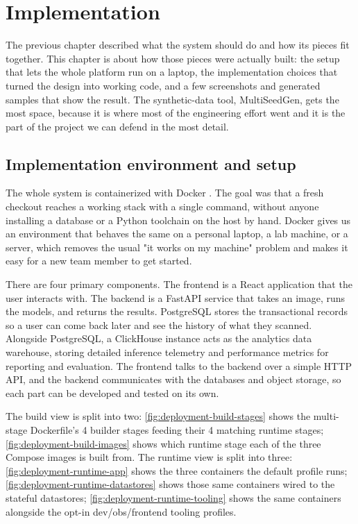 \chapter{Implementation}

The previous chapter described what the system should do and how its pieces fit
together. This chapter is about how those pieces were actually built: the setup
that lets the whole platform run on a laptop, the implementation choices that
turned the design into working code, and a few screenshots and generated samples
that show the result. The synthetic-data tool, MultiSeedGen, gets the most space,
because it is where most of the engineering effort went and it is the part of the
project we can defend in the most detail.

\section{Implementation environment and setup}

The whole system is containerized with Docker \cite{merkel2014docker}. The goal
was that a fresh checkout reaches a working stack with a single command, without
anyone installing a database or a Python toolchain on the host by hand. Docker
gives us an environment that behaves the same on a personal laptop, a lab
machine, or a server, which removes the usual "it works on my machine" problem
and makes it easy for a new team member to get started.

There are four primary components. The frontend is a React application \cite{reactindepth} that the user interacts with. The backend is a FastAPI service \cite{fastapi} that takes an image, runs the models, and returns the results. PostgreSQL stores the transactional records so a user can come back later and see the history of what they scanned. Alongside PostgreSQL, a ClickHouse instance acts as the analytics data warehouse, storing detailed inference telemetry and performance metrics for reporting and evaluation. The frontend talks to the backend over a simple HTTP API, and the backend communicates with the databases and object storage, so each part can be developed and tested on its own.

The build view is split into two: \autoref{fig:deployment-build-stages} shows
the multi-stage Dockerfile's 4 builder stages feeding their 4 matching runtime
stages; \autoref{fig:deployment-build-images} shows which runtime stage each
of the three Compose images is built from. The runtime view is split into
three: \autoref{fig:deployment-runtime-app} shows the three containers the
default profile runs; \autoref{fig:deployment-runtime-datastores} shows those
same containers wired to the stateful datastores; \autoref{fig:deployment-runtime-tooling}
shows the same containers alongside the opt-in dev/obs/frontend tooling
profiles.

